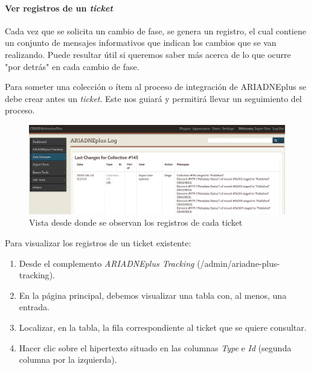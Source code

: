 \documentclass[
]{article}
\providecommand{\tightlist}{%
  \setlength{\itemsep}{0pt}\setlength{\parskip}{0pt}}
\begin{document}
\hypertarget{ver-registros-de-un-ticket}{%
\paragraph{\texorpdfstring{Ver registros de un
\emph{ticket}}{Ver registros de un ticket}}\label{ver-registros-de-un-ticket}}

Cada vez que se solicita un cambio de fase, se genera un registro, el
cual contiene un conjunto de mensajes informativos que indican los
cambios que se van realizando. Puede resultar útil si queremos saber más
acerca de lo que ocurre "por detrás" en cada cambio de fase.

Para someter una colección o ítem al proceso de integración de
ARIADNEplus se debe crear antes un \emph{ticket}. Este nos guiará y
permitirá llevar un seguimiento del proceso.

\begin{figure}
\hypertarget{ariadne-plus-tracking-logs}{%
\centering
\includegraphics{../_static/images/ariadne-plus-tracking-logs.png}
\caption{Vista desde donde se observan los registros de cada
ticket}\label{ariadne-plus-tracking-logs}
}
\end{figure}

Para visualizar los registros de un ticket existente:

\begin{enumerate}
\def\labelenumi{\arabic{enumi}.}
\tightlist
\item
  Desde el complemento \emph{ARIADNEplus Tracking}
  ({/admin/ariadne-plus-tracking}).
\item
  En la página principal, debemos visualizar una tabla con, al menos,
  una entrada.
\item
  Localizar, en la tabla, la fila correspondiente al ticket que se
  quiere consultar.
\item
  Hacer clic sobre el hipertexto situado en las columnas \emph{Type} e
  \emph{Id} (segunda columna por la izquierda).
\end{enumerate}
\end{document}
